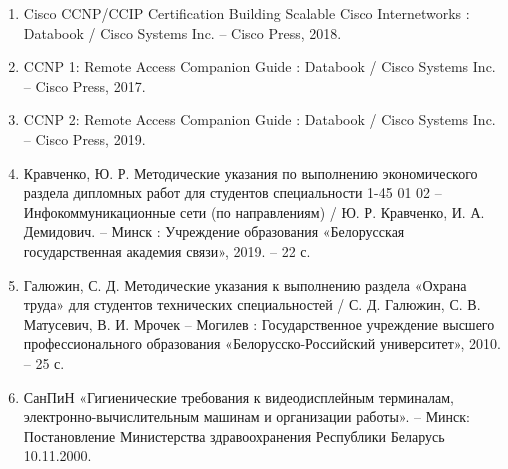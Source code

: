 \begin{enumerate}[{label=\arabic{*}}]
    \item Cisco CCNP/CCIP Certification Building Scalable Cisco Internetworks : Databook / Cisco Systems Inc. – Cisco Press, 2018.
    \item CCNP 1: Remote Access Companion Guide : Databook / Cisco Systems Inc. – Cisco Press, 2017.
    \item CCNP 2: Remote Access Companion Guide : Databook / Cisco Systems Inc. – Cisco Press, 2019.
    \item Кравченко, Ю. Р. Методические указания по выполнению экономического раздела дипломных работ для студентов специальности 1-45 01 02 – Инфокоммуникационные сети (по направлениям) / Ю. Р. Кравченко, И. А. Демидович. – Минск : Учреждение образования «Белорусская государственная академия связи», 2019. – 22 с.
    \item Галюжин, С. Д. Методические указания к выполнению раздела «Охрана труда» для студентов технических специальностей / С. Д. Галюжин, С. В. Матусевич, В. И. Мрочек – Могилев : Государственное учреждение высшего профессионального образования «Белорусско-Российский университет», 2010. – 25 с.
    \item СанПиН «Гигиенические требования к видеодисплейным терминалам, электронно-вычислительным машинам и организации работы». – Минск: Постановление Министерства здравоохранения Республики Беларусь 10.11.2000.

   
\end{enumerate}
